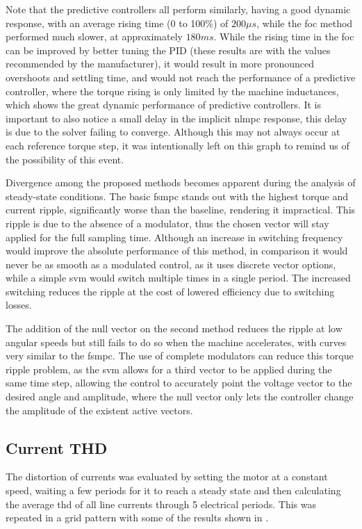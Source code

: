 Note that the predictive controllers all perform similarly, having a good dynamic response, with an average rising time (0 to 100\%) of $200\mu s$, while the \gls{foc} method performed much slower, at approximately $180ms$. While the rising time in the \gls{foc} can be improved by better tuning the PID (these results are with the values recommended by the manufacturer), it would result in more pronounced overshoots and settling time, and would not reach the performance of a predictive controller, where the torque rising is only limited by the machine inductances, which shows the great dynamic performance of predictive controllers. It is important to also notice a small delay in the implicit \gls{nlmpc} response, this delay is due to the solver failing to converge. Although this may not always occur at each reference torque step, it was intentionally left on this graph to remind us of the possibility of this event. 

Divergence among the proposed methods becomes apparent during the analysis of steady-state conditions. The basic \gls{fsmpc} stands out with the highest torque and current ripple, significantly worse than the baseline, rendering it impractical. This ripple is due to the absence of a modulator, thus the chosen vector will stay applied for the full sampling time. Although an increase in switching frequency would improve the absolute performance of this method, in comparison it would never be as smooth as a modulated control, as it uses discrete vector options, while a simple \gls{svm} would switch multiple times in a single period. The increased switching reduces the ripple at the cost of lowered efficiency due to switching losses.

The addition of the null vector on the second method reduces the ripple at low angular speeds but still fails to do so when the machine accelerates, with curves very similar to the \gls{fsmpc}. The use of complete modulators can reduce this torque ripple problem, as the \gls{svm} allows for a third vector to be applied during the same time step, allowing the control to accurately point the voltage vector to the desired angle and amplitude, where the null vector only lets the controller change the amplitude of the existent active vectors.
\subsection{Current THD}

The distortion of currents was evaluated by setting the motor at a constant speed, waiting a few periods for it to reach a steady state and then calculating the average \gls{thd} of all line currents through 5 electrical periods. This was repeated in a grid pattern with some of the results shown in .

